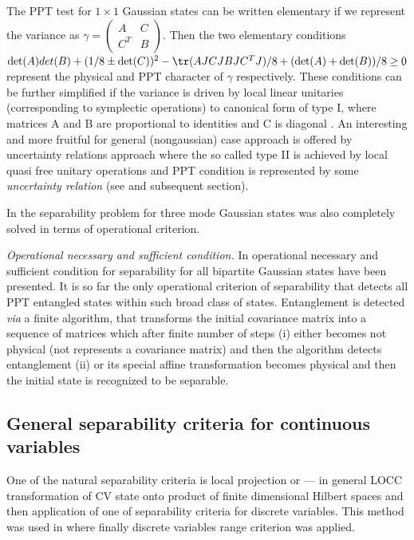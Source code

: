 \documentclass[rmp,12pt,preprint]{revtex4-2}
\begin{document}
The PPT test for $1\times 1$ Gaussian states
can be written elementary if we represent the
variance as $\gamma=\left(
\begin{array}{cc}
A &C\\
C^{T} &B
\end{array} \right)$.
Then the two elementary conditions \cite{Simon} $\det(A)det(B)+(1/8
\pm \det(C))^{2} - \tr(AJCJBJC^{T}J)/8 + (\det(A) +\det(B))/8 \geq 0$
represent the physical and PPT character of $\gamma$ respectively.
These conditions can be further simplified if the variance is driven
by local linear unitaries (corresponding to symplectic operations)
to canonical form of type I, where matrices A and B are proportional
to identities and C is diagonal \cite{Simon}. An interesting and
more fruitful for general (nongaussian) case approach is offered by
uncertainty relations approach where the so called type II is
achieved by local quasi free unitary operations and PPT condition is
represented by some {\it uncertainty relation}
(see \cite{DuanGCZ1999-criterion} and subsequent section).

In \cite{1x1x1} the separability problem for three mode Gaussian
states was also completely solved in terms of operational criterion.

{\it Operational necessary and sufficient condition.}  In
\cite{GaussianAlgorithm} operational necessary and sufficient
condition for separability for all bipartite Gaussian states have been
presented. It is so far the only operational criterion of separability
that detects all PPT entangled states within such broad class of
states. Entanglement is detected {\it via} a finite algorithm, that
transforms the initial covariance matrix into a sequence of matrices
which after finite number of steps (i) either becomes not physical
(not represents a covariance matrix) and then the algorithm detects
entanglement (ii) or its special affine transformation becomes
physical and then the initial state is recognized to be separable.



\subsection{General separability criteria for continuous variables}
\label{subsec:sep_cont_var}

One of the natural separability criteria is local projection or --- in
general LOCC transformation of CV state onto product of finite
dimensional Hilbert spaces and then application of one of separability
criteria for discrete variables. This method was used in
\cite{boundCV} where finally discrete variables range criterion was
applied.
\end{document}
